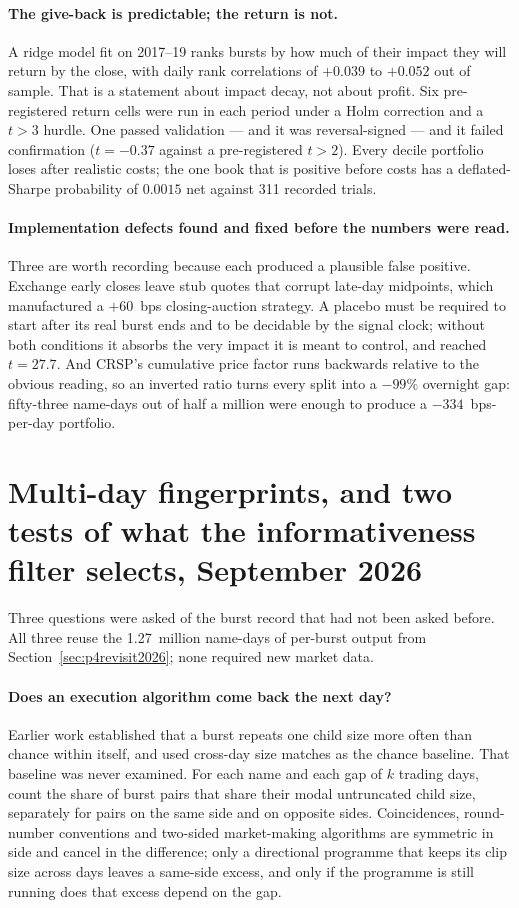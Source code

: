 \documentclass[11pt]{article}
\begin{document}
\paragraph{The give-back is predictable; the return is not.} A ridge model fit on 2017--19 ranks
bursts by how much of their impact they will return by the close, with daily rank correlations of
$+0.039$ to $+0.052$ out of sample. That is a statement about impact decay, not about profit. Six
pre-registered return cells were run in each period under a Holm correction and a $t>3$ hurdle. One
passed validation --- and it was reversal-signed --- and it failed confirmation ($t=-0.37$ against a
pre-registered $t>2$). Every decile portfolio loses after realistic costs; the one book that is
positive before costs has a deflated-Sharpe probability of $0.0015$ net against 311 recorded trials.

\paragraph{Implementation defects found and fixed before the numbers were read.} Three are worth
recording because each produced a plausible false positive. Exchange early closes leave stub quotes
that corrupt late-day midpoints, which manufactured a $+60$~bps closing-auction strategy. A
placebo must be required to start after its real burst ends and to be decidable by the signal
clock; without both conditions it absorbs the very impact it is meant to control, and reached
$t=27.7$. And CRSP's cumulative price factor runs backwards relative to the obvious reading, so an
inverted ratio turns every split into a $-99\%$ overnight gap: fifty-three name-days out of half a
million were enough to produce a $-334$~bps-per-day portfolio.

\section{Multi-day fingerprints, and two tests of what the informativeness filter selects, September 2026}
\label{sec:multiday2026}

Three questions were asked of the burst record that had not been asked before. All three reuse the
1.27~million name-days of per-burst output from Section~\ref{sec:p4revisit2026}; none required new market data.

\paragraph{Does an execution algorithm come back the next day?} Earlier work established that a burst repeats
one child size more often than chance within itself, and used cross-day size matches as the chance baseline.
That baseline was never examined. For each name and each gap of $k$ trading days, count the share of burst
pairs that share their modal untruncated child size, separately for pairs on the same side and on opposite
sides. Coincidences, round-number conventions and two-sided market-making algorithms are symmetric in side and
cancel in the difference; only a directional programme that keeps its clip size across days leaves a same-side
excess, and only if the programme is still running does that excess depend on the gap.
\end{document}
